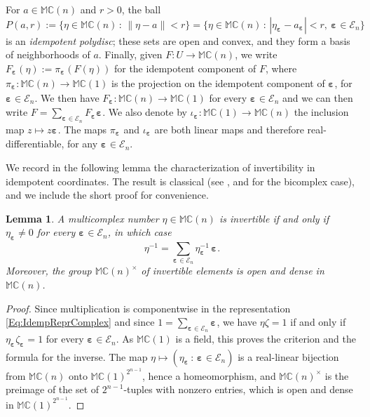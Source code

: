 \documentclass[12pt]{amsart}
\theoremstyle{plain}
\newtheorem{lemma}[theorem]{Lemma}
\theoremstyle{definition}
\numberwithin{equation}{section}
\newcommand{\bep}[1]{\bm{\varepsilon_{#1}}}
\newcommand{\mC}{\mathbb{C}}
\newcommand{\mM}{\mathbb{M}}
\newcommand{\ra}{\rightarrow}
\begin{document}
For $a \in \mM \mC(n)$ and $r > 0$, the ball
    \[
    P ( a , r ) := \{ \eta \in \mM \mC(n)\, :\, \| \eta - a \| < r \}
    = \{ \eta \in \mM \mC(n)\, :\, | \eta_{\bep{}} - a_{\bep{}} | < r , \ \bep{} \in \mathcal{E}_n \}
    \]
is an \emph{idempotent polydisc}; these sets are open and convex, and they
form a basis of neighborhoods of $a$. Finally, given
$F : U \ra \mM \mC(n)$, we write $F_{\bep{}} (\eta ) := \pi_{\bep{}}(F (\eta ))$ for
the idempotent component of $F$, where $\pi_{\bep{}} : \mM \mC (n) \ra \mM \mC (1)$ is the projection on the idempotent component of $\bep{}$, for $\bep{} \in \mathcal{E}_n$. We then have $F_{\bep{}} : \mM \mC (n) \ra \mM \mC (1)$ for every $\bep{} \in \mathcal{E}_n$ and we can then write $F = \sum_{\bep{} \in \mathcal{E}_n} F_{\bep{}} \bep{}$. We also denote by $\iota_{\bep{}} : \mM \mC (1) \ra \mM \mC (n)$ the inclusion map $z \mapsto z \bep{}$. The maps $\pi_{\bep{}}$ and $\iota_{\bep{}}$ are both linear maps and therefore real-differentiable, for any $\bep{} \in \mathcal{E}_n$. 

We record in the following lemma the characterization of invertibility in idempotent
coordinates. The result is classical (see \cite{Baley}, and
\cite{Bicomplex, RochonShapiro} for the bicomplex case), and we include the
short proof for convenience. 

    \begin{lemma}\label{L:Invertibility}
    A multicomplex number $\eta \in \mM \mC(n)$ is invertible if and only if
    $\eta_{\bep{}} \neq 0$ for every $\bep{} \in \mathcal{E}_n$, in which case
        \[
        \eta^{-1} = \sum_{\bep{} \in \mathcal{E}_n} \eta_{\bep{}}^{-1}\, \bep{} .
        \]
    Moreover, the group $\mM \mC(n)^\times$ of invertible elements is open and
    dense in $\mM \mC(n)$.
    \end{lemma}

    \begin{proof}
    Since multiplication is componentwise in the representation \eqref{Eq:IdempReprComplex} and since $1 = \sum_{\bep{} \in \mathcal{E}_n} \bep{}$, we have $\eta \zeta = 1$ if and only if $\eta_{\bep{}} \zeta_{\bep{}} = 1$ for every $\bep{} \in \mathcal{E}_n$. 
    As $\mM \mC(1)$ is a field, this proves the criterion and the formula for the inverse. 
    The map $\eta \mapsto ( \eta_{\bep{}} \, : \, \bep{} \in \mathcal{E}_n )$ is a real-linear bijection from $\mM \mC(n)$ onto $\mM \mC(1)^{2^{n-1}}$, hence a homeomorphism, and $\mM \mC(n)^\times$ is the preimage of the set of $2^{n-1}$-tuples with nonzero entries, which is open and dense in $\mM \mC(1)^{2^{n-1}}$.
    \end{proof}
\end{document}
